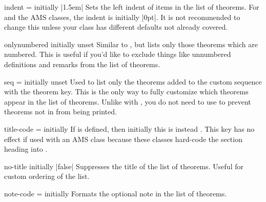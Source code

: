 \documentclass{ltxdoc}
\newcommand{\ttbraces}[1]{\braces{\texttt{#1}}}
\begin{document}
\begin{docKey}{indent}
  {=}
  {initially |1.5em|}
Sets the left indent of items in the list of theorems.
For  and the AMS classes, the indent is initially |0pt|.
It is not recommended to change this unless your class has different defaults not already covered.
\end{docKey}

\begin{docKey}{onlynumbered}
  {}
  {initially unset}
Similar to , but lists only those theorems which are numbered.
This is useful if you'd like to exclude things like unnumbered definitions and remarks from the list of theorems.
\end{docKey}

\begin{docKey}[][doc label=listof/seq]{seq}
  {=}
  {initially unset}
Used to list only the theorems added to the custom sequence  with the  theorem key.
This is the only way to fully customize which theorems appear in the list of theorems.
Unlike with , you do not need to use  to prevent theorems not in  from being printed.
\end{docKey}

\begin{docKey}{title-code}
  {=}
  {initially \ttbraces{\#1}}
If  is defined, then initially this is instead \ttbraces{\#1}. This key has no effect if used with an AMS class because these classes hard-code the section heading into .
\end{docKey}

\begin{docKey}{no-title}
  {}
  {initially |false|}
Suppresses the title of the list of theorems.
Useful for custom ordering of the list.

\begin{keythmscode}[]
\listofkeytheorems[show=example]
\listofkeytheorems[show=solution,no-title]
\end{keythmscode}

\end{docKey}

\begin{docKey}{note-code}
  {=}
  {initially \ttbraces{ (\#1)}}
Formats the optional note in the list of theorems.
\end{docKey}
\end{document}

